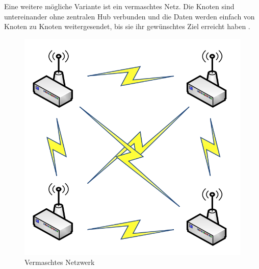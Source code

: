 Eine weitere mögliche Variante ist ein vermaschtes Netz. Die Knoten sind untereinander ohne zentralen Hub verbunden und die Daten werden einfach von Knoten zu Knoten weitergesendet, bis sie ihr gewünschtes Ziel erreicht haben \cite{d:kosmerchock}. 

\begin{figure}[H] 
	\centering
	\includegraphics[scale=0.5]{Bilder/mesh}
	\caption{Vermaschtes Netzwerk\cite{d:kosmerchock}}
	\label{f:mesh}
\end{figure}